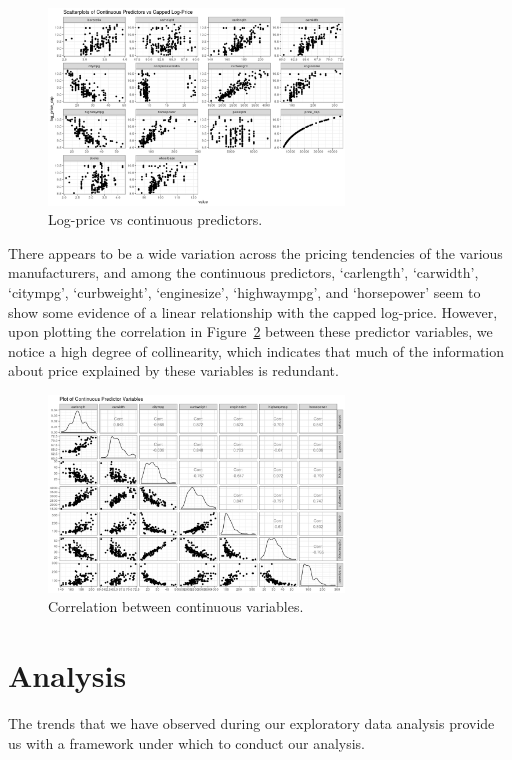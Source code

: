 \documentclass[a4paper, 10pt, titlepage]{article}
\begin{document}
	\begin{figure}[!ht]
	\centering
	    \includegraphics[width = 0.7\textwidth]{resp_scatter.png}
	\caption{Log-price vs continuous predictors.}
	\label{figure:resp scatter}
    \end{figure}
    
There appears to be a wide variation across the pricing tendencies of the various manufacturers, and among the continuous predictors, `carlength', `carwidth', `citympg', `curbweight', `enginesize', `highwaympg', and `horsepower' seem to show some evidence of a linear relationship with the capped log-price. However, upon plotting the correlation in Figure~\ref{figure:conts coll} between these predictor variables, we notice a high degree of collinearity, which indicates that much of the information about price explained by these variables is redundant.

	\begin{figure}[!ht]
	\centering
	    \includegraphics[width = 0.7\textwidth]{conts_var_pairs.png}
	\caption{Correlation between continuous variables.}
	\label{figure:conts coll}
    \end{figure}

\section{Analysis}
The trends that we have observed during our exploratory data analysis provide us with a framework under which to conduct our analysis.
\end{document}
